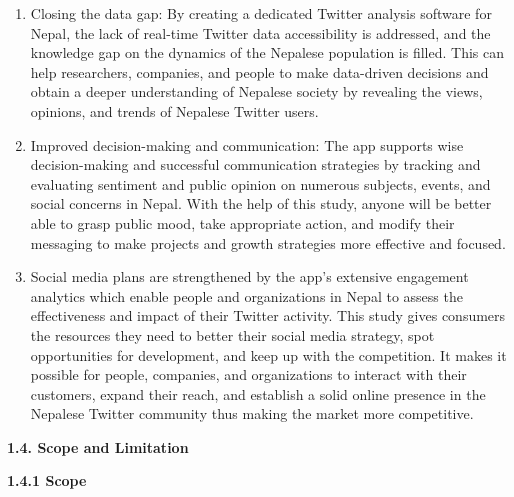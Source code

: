 \documentclass[a4paper,12pt]{article}
\begin{document}
{{{		\begin{enumerate}
												
			\item  Closing the data gap: By creating a dedicated Twitter analysis software for Nepal, the lack of real-time Twitter data accessibility is addressed, and the knowledge gap on the dynamics of the Nepalese population is filled. This can help researchers, companies, and people to make data-driven decisions and obtain a deeper understanding of Nepalese society by revealing the views, opinions, and trends of Nepalese Twitter users.
			      			      			      			      
			\item Improved decision-making and communication: The app supports wise decision-making and successful communication strategies by tracking and evaluating sentiment and public opinion on numerous subjects, events, and social concerns in Nepal. With the help of this study, anyone will be better able to grasp public mood, take appropriate action, and modify their messaging to make projects and growth strategies more effective and focused.
			      			      			      			      
			\item Social media plans are strengthened by the app's extensive engagement analytics which enable people and organizations in Nepal to assess the effectiveness and impact of their Twitter activity. This study gives consumers the resources they need to better their social media strategy, spot opportunities for development, and keep up with the competition. It makes it possible for people, companies, and organizations to interact with their customers, expand their reach, and establish a solid online presence in the Nepalese Twitter community thus making the market more competitive.
			      			      			      			      
		\end{enumerate}

  
						

  \newpage
								
		\begin{flushleft}
			\fontsize{13}{15}\selectfont\textbf{1.4. Scope and Limitation}
			\label{page4}
		\end{flushleft}
								
		\begin{flushleft}
			\fontsize{13}{15}\selectfont\textbf{1.4.1 Scope}
			\phantomsection
			\label{scope}
		\end{flushleft}
								
}}}
\end{document}
